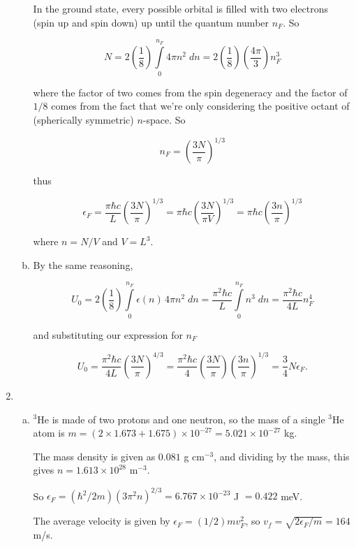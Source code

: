 \documentclass{article}
\begin{document}
\begin{enumerate}
\begin{enumerate}[(a)]
		In the ground state, every possible orbital is filled with two electrons (spin up and spin down) up until the quantum number $n_F$. So

		$$N = 2 \left(\frac{1}{8}\right) \int \limits_0^{n_F} 4 \pi n^2 \; dn = 2 \left(\frac{1}{8}\right) \left( \frac{4\pi}{3} \right) n_F^3$$

		where the factor of two comes from the spin degeneracy and the factor of $1/8$ comes from the fact that we're only considering the positive octant of (spherically symmetric) $n$-space. So

		$$n_F = \left(\frac{3N}{\pi}\right)^{1/3}$$

		thus

		$$\epsilon_F = \frac{\pi \hbar c}{L} \left(\frac{3N}{\pi}\right)^{1/3} = \pi \hbar c \left(\frac{3N}{\pi V}\right)^{1/3} = \pi \hbar c \left(\frac{3n}{\pi}\right)^{1/3}$$

		where $n = N/V$ and $V = L^3$.

		\item

		By the same reasoning,

		$$U_0 = 2 \left(\frac{1}{8}\right) \int \limits_0^{n_F} \epsilon(n) \, 4 \pi n^2 \; dn = \frac{\pi^2 \hbar c}{L} \int \limits_0^{n_F}  n^3 \; dn = \frac{\pi^2 \hbar c}{4L} n_F^4$$

		and substituting our expression for $n_F$

		$$U_0 = \frac{\pi^2 \hbar c}{4L} \left(\frac{3N}{\pi}\right)^{4/3} = \frac{\pi^2 \hbar c}{4} \left(\frac{3N}{\pi}\right) \left(\frac{3n}{\pi}\right)^{1/3} = \frac{3}{4}N\epsilon_F.$$

	\end{enumerate}

	\item

	\begin{enumerate}[(a)]

		\item

		$^3$He is made of two protons and one neutron, so the mass of a single $^3$He atom is $m = (2 \times 1.673 + 1.675) \times 10^{-27} = 5.021 \times 10^{-27}$ kg.

		The mass density is given as $0.081$ g cm$^{-3}$, and dividing by the mass, this gives $n = 1.613 \times 10^{28} \text{ m}^{-3}$. 

		So $\epsilon_F = (\hbar^2 / 2m) (3 \pi^2 n)^{2/3} = 6.767 \times 10^{-23}$ J $= 0.422$ meV.

		The average velocity is given by $\epsilon_F = (1/2)m v_F^2$, so $v_f = \sqrt{2 \epsilon_F / m} = 164 $ m/s.


\end{enumerate}
\end{enumerate}
\end{document}
